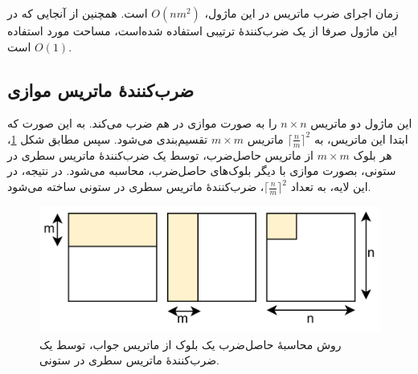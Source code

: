 \documentclass[conference]{IEEEtran-ModifiedForMVIP}
\begin{document}
زمان اجرای ضرب ماتریس در این ماژول،
$O(nm^2)$
است. همچنین از آنجایی که در این ماژول صرفا از یک ضرب‌کنندهٔ ترتیبی استفاده شده‌است، مساحت مورد استفاده
$O(1)$
است.

\subsection{
    ضرب‌کنندهٔ ماتریس موازی
}


این ماژول دو ماتریس 
$n \times n$
را به صورت موازی در هم ضرب می‌کند. 
به این صورت که ابتدا این ماتریس، به 
$\lceil\frac{n}{m}\rceil^2$
ماتریس 
$m \times m$
تقسیم‌بندی می‌شود.
سپس مطابق شکل
\ref{fig:ParallelMatrix}،
هر بلوک
$m \times m$
از ماتریس حاصل‌ضرب، توسط یک ضرب‌کنندهٔ ماتریس سطری در ستونی، بصورت موازی با دیگر بلوک‌های حاصل‌ضرب، محاسبه می‌شود.
در نتیجه، در این لایه، به تعداد
$\lceil\frac{n}{m}\rceil^2$،
ضرب‌کنندهٔ ماتریس سطری در ستونی ساخته می‌شود.
\begin{figure}[t]
\centering
\includegraphics[width=1\linewidth]{Images/ParallelMatrix.png}
\caption{
\centering
روش محاسبهٔ حاصل‌ضرب یک بلوک از ماتریس جواب، توسط یک ضرب‌کنندهٔ ماتریس سطری در ستونی.
}\label{fig:ParallelMatrix}
\end{figure}
\end{document}
